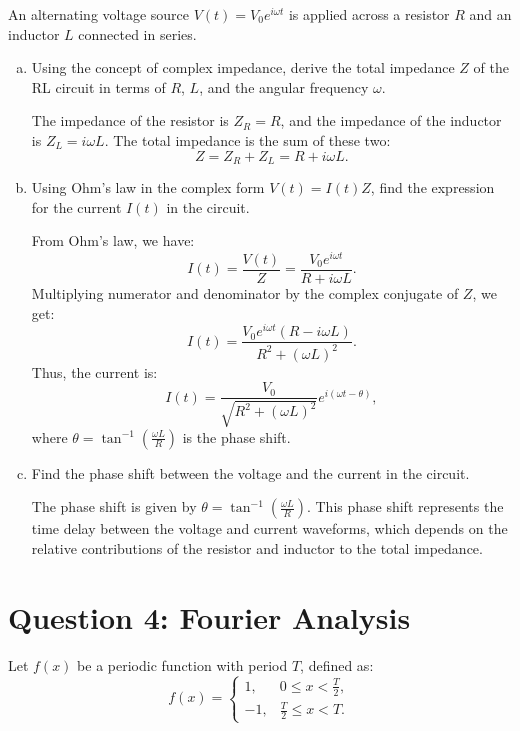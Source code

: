 \documentclass{article}
\begin{document}
An alternating voltage source \( V(t) = V_0 e^{i\omega t} \) is applied across a resistor \( R \) and an inductor \( L \) connected in series.

\begin{enumerate}[a)]
  \item Using the concept of complex impedance, derive the total impedance \( Z \) of the RL circuit in terms of \( R \), \( L \), and the angular frequency \( \omega \).

  The impedance of the resistor is \( Z_R = R \), and the impedance of the inductor is \( Z_L = i\omega L \). The total impedance is the sum of these two:
  \[
  Z = Z_R + Z_L = R + i\omega L.
  \]

  \item Using Ohm's law in the complex form \( V(t) = I(t) Z \), find the expression for the current \( I(t) \) in the circuit.

  From Ohm's law, we have:
  \[
  I(t) = \frac{V(t)}{Z} = \frac{V_0 e^{i\omega t}}{R + i\omega L}.
  \]
  Multiplying numerator and denominator by the complex conjugate of \( Z \), we get:
  \[
  I(t) = \frac{V_0 e^{i\omega t}(R - i\omega L)}{R^2 + (\omega L)^2}.
  \]
  Thus, the current is:
  \[
  I(t) = \frac{V_0}{\sqrt{R^2 + (\omega L)^2}} e^{i(\omega t - \theta)},
  \]
  where \( \theta = \tan^{-1}\left( \frac{\omega L}{R} \right) \) is the phase shift.

  \item Find the phase shift between the voltage and the current in the circuit.

  The phase shift is given by \( \theta = \tan^{-1}\left( \frac{\omega L}{R} \right) \). This phase shift represents the time delay between the voltage and current waveforms, which depends on the relative contributions of the resistor and inductor to the total impedance.
\end{enumerate}

\section*{Question 4: Fourier Analysis}

Let \( f(x) \) be a periodic function with period \( T \), defined as:
\[
f(x) = \begin{cases}
  1, & 0 \leq x < \frac{T}{2}, \\
  -1, & \frac{T}{2} \leq x < T.
\end{cases}
\]
\end{document}
